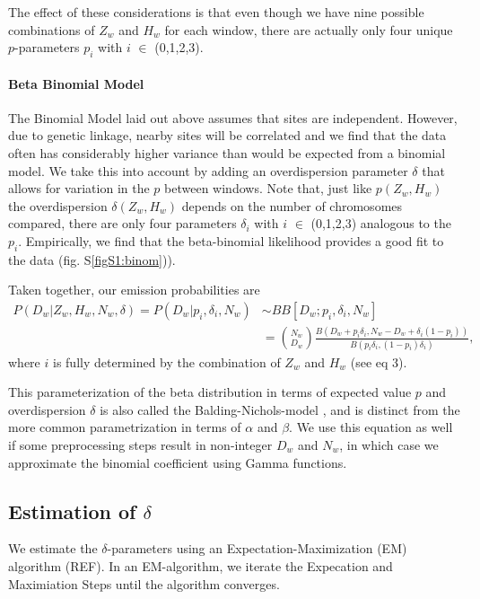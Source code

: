 \documentclass[12pt, letterpaper]{article}
\begin{document}
The effect of these considerations is that even though we have nine possible combinations of $Z_w$ and $H_w$ for each window, there are actually only four unique $p$-parameters $p_i$ with $i$ $\in$ (0,1,2,3). 

\paragraph{Beta Binomial Model}
The Binomial Model laid out above assumes that sites are independent. However, due to genetic linkage, nearby sites will be correlated and we find that the data often has considerably higher variance than would be expected from a binomial model. We take this into account by adding an overdispersion parameter $\delta$ that allows for variation in the $p$ between windows. Note that, just like $p(Z_w,H_w)$ the overdispersion $\delta(Z_w,H_w)$ depends on the number of chromosomes compared, there are only four parameters $\delta_i$ with $i$ $\in$ (0,1,2,3) analogous to the $p_i$. Empirically, we find that the beta-binomial likelihood provides a good fit to the data (fig. S\ref{figS1:binom})).  

Taken together, our emission probabilities are 
\begin{align}\label{eq:3}
P(D_{w}|Z_w,H_w,N_w, \delta) = P(D_{w}|p_i,\delta_i,N_w) &\sim BB[D_w; p_i, \delta_i, N_w] \nonumber\\
&= \binom{N_w}{D_w}\frac{B(D_w+p_i \delta_{i}, N_w-D_w+ \delta_{i}(1-p_{i}))}{ B(p_{i}\delta_{i}, (1-p_{i})\delta_{i})},
\end{align}
where $i$ is fully determined by the combination of $Z_w$ and $H_w$ (see eq 3).

This parameterization of the beta distribution in terms of expected value $p$ and overdispersion $\delta$ is also called the Balding-Nichols-model \cite{balding_method_nodate}, and is distinct from the more common parametrization in terms of $\alpha$ and $\beta$. We use this equation as well if some preprocessing steps result in non-integer $D_w$ and $N_w$, in which case we approximate the binomial coefficient using Gamma functions.   

\subsection{Estimation of $\delta$}\label{delta}
We estimate the $\delta$-parameters using an Expectation-Maximization (EM) algorithm (REF). In an EM-algorithm, we iterate the Expecation and Maximiation Steps until the algorithm converges.
\end{document}
